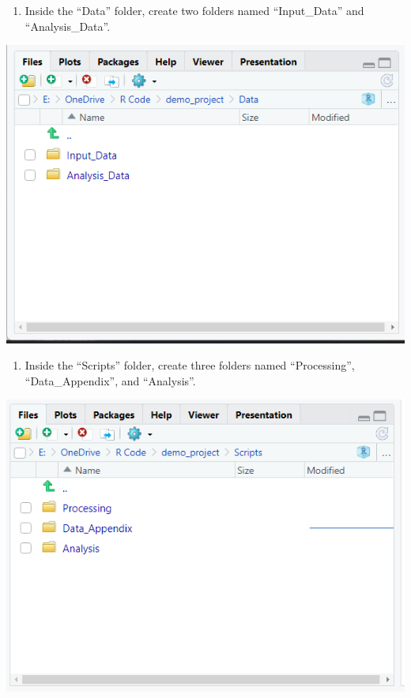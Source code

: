\documentclass[
]{book}
\providecommand{\tightlist}{%
  \setlength{\itemsep}{0pt}\setlength{\parskip}{0pt}}
\begin{document}
\begin{enumerate}
\def\labelenumi{\arabic{enumi}.}
\setcounter{enumi}{3}
\tightlist
\item
  Inside the ``Data'' folder, create two folders named ``Input\_Data'' and ``Analysis\_Data''.
\end{enumerate}

\includegraphics[width=7.96in]{images/tierdata}

\begin{enumerate}
\def\labelenumi{\arabic{enumi}.}
\setcounter{enumi}{4}
\tightlist
\item
  Inside the ``Scripts'' folder, create three folders named ``Processing'', ``Data\_Appendix'', and ``Analysis''.
\end{enumerate}

\includegraphics[width=7.97in]{images/tierscripts}
\end{document}
